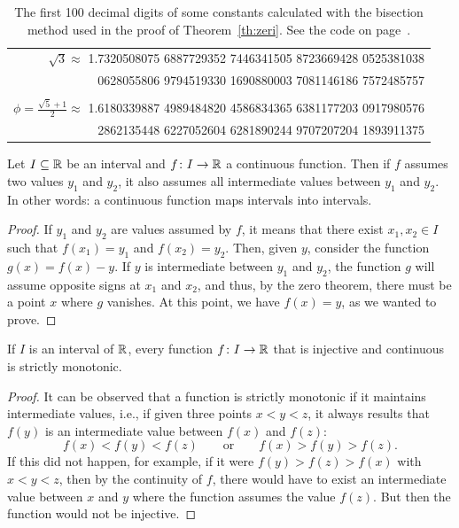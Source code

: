 \begin{table}
\begin{center}
\begin{tabular}{r}
\\
$\sqrt 3 \approx$ \ttfamily\footnotesize 
1.7320508075 6887729352 7446341505 8723669428 0525381038 \\
\ttfamily\footnotesize
0628055806 9794519330 1690880003 7081146186 7572485757 \\
\\
$\phi = \frac{\sqrt 5+1}{2} \approx $ \ttfamily\footnotesize 
1.6180339887 4989484820 4586834365 6381177203 0917980576 \\
\ttfamily\footnotesize
2862135448 6227052604 6281890244 9707207204 1893911375
  \end{tabular}
\end{center}
\caption{The first 100 decimal digits of some
constants calculated with the bisection method used in the proof
of Theorem~\ref{th:zeri}.
See the code on page~\pageref{code:bisection}.}
\label{fig:cifre_sqrt2}
\end{table}

\begin{theorem}
\label{th:valori_intermedi}%
\mymark{**}%
%
%
%
Let $I\subseteq {\mathbb R}$ be an interval and $f\colon I \to {\mathbb R}$ a
continuous function.
Then if $f$ assumes two values $y_1$ and $y_2$, it also assumes all intermediate
values between $y_1$ and $y_2$.
In other words: a continuous function
maps intervals into intervals.
\end{theorem}
%
\begin{proof}
If $y_1$ and $y_2$ are values assumed by $f$, it means
that there exist $x_1,x_2 \in I$ such that $f(x_1)= y_1$ and $f(x_2)=y_2$.
Then, given $y$, consider the function $g(x) = f(x)-y$.
If $y$ is intermediate between $y_1$ and $y_2$, the function $g$ will
assume opposite signs at $x_1$ and $x_2$, and thus, by the zero theorem,
there must be a point $x$ where $g$ vanishes. At this point,
we have $f(x)=y$, as we wanted to prove.
\end{proof}

\begin{lemma}
\label{ex:inversa_monotona}%
If $I$ is an interval of ${\mathbb R}$, every function $f\colon I \to {\mathbb R}$
that is injective and continuous is strictly monotonic.
\end{lemma}
%
\begin{proof}
It can be observed that a function is strictly monotonic if it maintains
intermediate values, i.e., if given three points
$x<y<z$, it always results that $f(y)$ is an intermediate value between $f(x)$
and $f(z)$:
\[
  f(x)< f(y) <f(z) \qquad\text{or} \qquad f(x)> f(y) > f(z).
\]
If this did not happen, for example, if it were $f(y)>f(z)>f(x)$ with $x<y<z$,
then by the continuity of $f$, there would have to exist an intermediate value
between $x$ and $y$ where the function assumes the value $f(z)$. But then the
function
would not be injective.
\end{proof}

